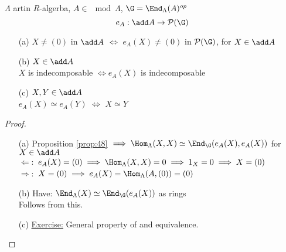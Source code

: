 \begin{lem}
$\Lambda$ artin $R$-algerba, $A \in \mod \Lambda$, $\G = \End_\Lambda(A)^{op}$
\[ e_A: \add A \to \mathcal{P}(\G) \]
\begin{enumerate}
\item[(a)] $X \neq (0)$ in $\add A$ $\iff$ $e_A(X) \neq (0)$ in $\mathcal{P}(\G)$, for $X \in \add A$

\item[(b)] $X \in \add A$\\
$X$ is indecomposable $\iff e_A(X)$ is indecomposable
\item[(c)] $X, Y \in \add A$\\
$e_A(X) \simeq e_A(Y)$ $\iff$ $X \simeq Y$
\end{enumerate}

\begin{proof}
\begin{enumerate}
\item[]
\item[(a)] Proposition \ref{prop:48} $\implies \Hom_\Lambda(X, X) \simeq \End_\G(e_A(X), e_A(X))$ for $X \in \add A$\\
\underline{$\Leftarrow:$} $e_A(X) = (0) \implies \Hom_\Lambda(X,X) = 0 \implies 1_X = 0 \implies X = (0)$\\
\underline{$\Rightarrow:$} $X = (0) \implies e_A(X) = \Hom_\Lambda(A, (0)) = (0)$
\item[(b)] Have: $\End_\Lambda(X) \simeq \End_\G(e_A(X))$ as rings\\
Follows from this.
\item[(c)] \underline{Exercise:} General property of and equivalence.
\end{enumerate}
\end{proof}
\end{lem}



